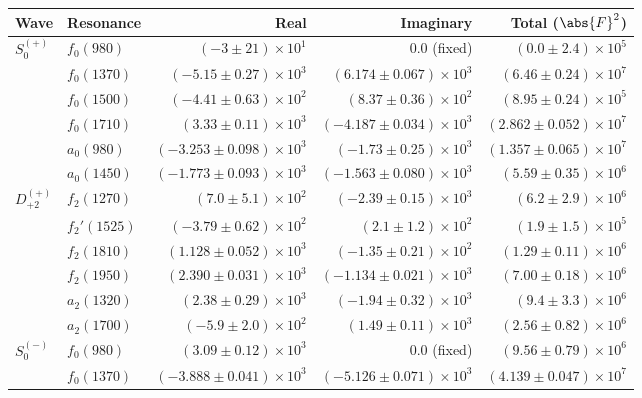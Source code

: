 \begin{table}[ht]
    \begin{center}
        \begin{tabular}{llrrr}\toprule
        Wave & Resonance & Real & Imaginary & Total ($\abs{F}^2$) \\\midrule
$S_{0}^{(+)}$ & $f_{0}(980)$ & $(-3 \pm 21) \times 10^{1}$ & $0.0$ (fixed) & $(0.0 \pm 2.4) \times 10^{5}$ \\
 & $f_{0}(1370)$ & $(-5.15 \pm 0.27) \times 10^{3}$ & $(6.174 \pm 0.067) \times 10^{3}$ & $(6.46 \pm 0.24) \times 10^{7}$ \\
 & $f_{0}(1500)$ & $(-4.41 \pm 0.63) \times 10^{2}$ & $(8.37 \pm 0.36) \times 10^{2}$ & $(8.95 \pm 0.24) \times 10^{5}$ \\
 & $f_{0}(1710)$ & $(3.33 \pm 0.11) \times 10^{3}$ & $(-4.187 \pm 0.034) \times 10^{3}$ & $(2.862 \pm 0.052) \times 10^{7}$ \\
 & $a_{0}(980)$ & $(-3.253 \pm 0.098) \times 10^{3}$ & $(-1.73 \pm 0.25) \times 10^{3}$ & $(1.357 \pm 0.065) \times 10^{7}$ \\
 & $a_{0}(1450)$ & $(-1.773 \pm 0.093) \times 10^{3}$ & $(-1.563 \pm 0.080) \times 10^{3}$ & $(5.59 \pm 0.35) \times 10^{6}$ \\
$D_{+2}^{(+)}$ & $f_{2}(1270)$ & $(7.0 \pm 5.1) \times 10^{2}$ & $(-2.39 \pm 0.15) \times 10^{3}$ & $(6.2 \pm 2.9) \times 10^{6}$ \\
 & $f_{2}'(1525)$ & $(-3.79 \pm 0.62) \times 10^{2}$ & $(2.1 \pm 1.2) \times 10^{2}$ & $(1.9 \pm 1.5) \times 10^{5}$ \\
 & $f_{2}(1810)$ & $(1.128 \pm 0.052) \times 10^{3}$ & $(-1.35 \pm 0.21) \times 10^{2}$ & $(1.29 \pm 0.11) \times 10^{6}$ \\
 & $f_{2}(1950)$ & $(2.390 \pm 0.031) \times 10^{3}$ & $(-1.134 \pm 0.021) \times 10^{3}$ & $(7.00 \pm 0.18) \times 10^{6}$ \\
 & $a_{2}(1320)$ & $(2.38 \pm 0.29) \times 10^{3}$ & $(-1.94 \pm 0.32) \times 10^{3}$ & $(9.4 \pm 3.3) \times 10^{6}$ \\
 & $a_{2}(1700)$ & $(-5.9 \pm 2.0) \times 10^{2}$ & $(1.49 \pm 0.11) \times 10^{3}$ & $(2.56 \pm 0.82) \times 10^{6}$ \\
$S_{0}^{(-)}$ & $f_{0}(980)$ & $(3.09 \pm 0.12) \times 10^{3}$ & $0.0$ (fixed) & $(9.56 \pm 0.79) \times 10^{6}$ \\
 & $f_{0}(1370)$ & $(-3.888 \pm 0.041) \times 10^{3}$ & $(-5.126 \pm 0.071) \times 10^{3}$ & $(4.139 \pm 0.047) \times 10^{7}$ \\

\end{tabular}
\end{center}
\end{table}
